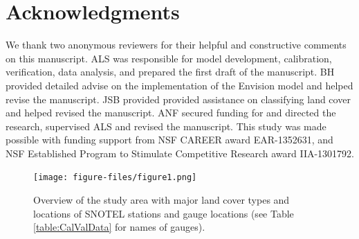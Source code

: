 \documentclass[11pt,letterpaper]{article}
\begin{document}
\section*{Acknowledgments}
We thank two anonymous reviewers for their helpful and constructive comments on this manuscript. ALS was responsible for model development, calibration, verification, data analysis, and prepared the first draft of the manuscript. BH provided detailed advise on the implementation of the Envision model and helped revise the manuscript. JSB provided provided assistance on classifying land cover and helped revised the manuscript. ANF secured funding for and directed the research, supervised ALS and revised the manuscript. This study was made possible with funding support from NSF CAREER award EAR-1352631, and NSF Established Program to Stimulate Competitive Research award IIA-1301792.


\renewcommand\bibname{References}










\clearpage

\begin{figure}
\centering
\texttt{[image: figure-files/figure1.png]}
\caption{Overview of the study area with major land cover types and locations of SNOTEL stations and gauge locations (see Table \ref{table:CalValData} for names of gauges).}
\label{fig:StudySite}
\end{figure}
\clearpage
\end{document}
